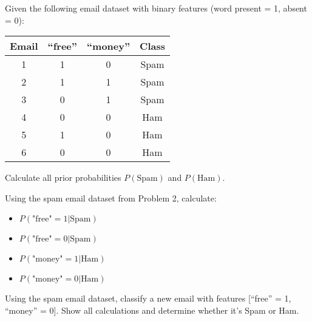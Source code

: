\documentclass{article}
\newcounter{exercise}
\begin{document}
\begin{tcolorbox}[colback=gray!5!white,colframe=gray!75!black,title=Problem \stepcounter{exercise}: Spam Email Classification - Setup]

Given the following email dataset with binary features (word present = 1, absent = 0):

\begin{center}
\begin{tabular}{|c|c|c|c|}
\hline
Email & ``free'' & ``money'' & Class \\
\hline
1 & 1 & 0 & Spam \\
2 & 1 & 1 & Spam \\
3 & 0 & 1 & Spam \\
4 & 0 & 0 & Ham \\
5 & 1 & 0 & Ham \\
6 & 0 & 0 & Ham \\
\hline
\end{tabular}
\end{center}

Calculate all prior probabilities $P(\text{Spam})$ and $P(\text{Ham})$.
\end{tcolorbox}

\begin{tcolorbox}[colback=gray!5!white,colframe=gray!75!black,title=Problem \stepcounter{exercise}: Likelihood Calculation]

Using the spam email dataset from Problem 2, calculate:
\begin{itemize}
    \item $P(\text{"free"} = 1|\text{Spam})$
    \item $P(\text{"free"} = 0|\text{Spam})$
    \item $P(\text{"money"} = 1|\text{Ham})$
    \item $P(\text{"money"} = 0|\text{Ham})$
\end{itemize}
\end{tcolorbox}

\begin{tcolorbox}[colback=gray!5!white,colframe=gray!75!black,title=Problem \stepcounter{exercise}: Classification Decision]

Using the spam email dataset, classify a new email with features [``free'' = 1, ``money'' = 0]. Show all calculations and determine whether it's Spam or Ham.
\end{tcolorbox}
\end{document}
